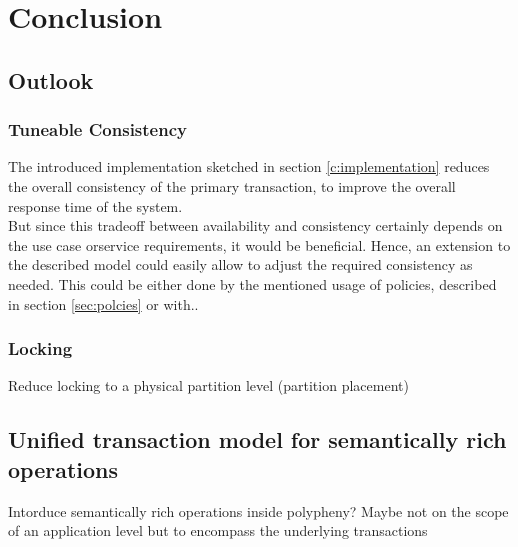 \chapter{Conclusion}
\label{c:conclusion}

\section{Outlook}

\subsection{Tuneable Consistency}
The introduced implementation sketched in section \ref{c:implementation} reduces the overall consistency of the primary transaction,
to improve the overall response time of the system.\\ 
But since this tradeoff between availability and consistency certainly depends on the use case orservice requirements, it would be beneficial.
Hence, an extension to the described model could easily allow to adjust the required consistency as needed. 
This could be either done by the mentioned usage of policies, described in section \ref{sec:polcies} or with..

\subsection{Locking}
Reduce locking to a physical partition level  (partition placement)

\tocless\section{Unified transaction model for semantically rich operations}
Intorduce semantically rich operations inside polypheny? 
Maybe not on the scope of an application level but to encompass the underlying transactions